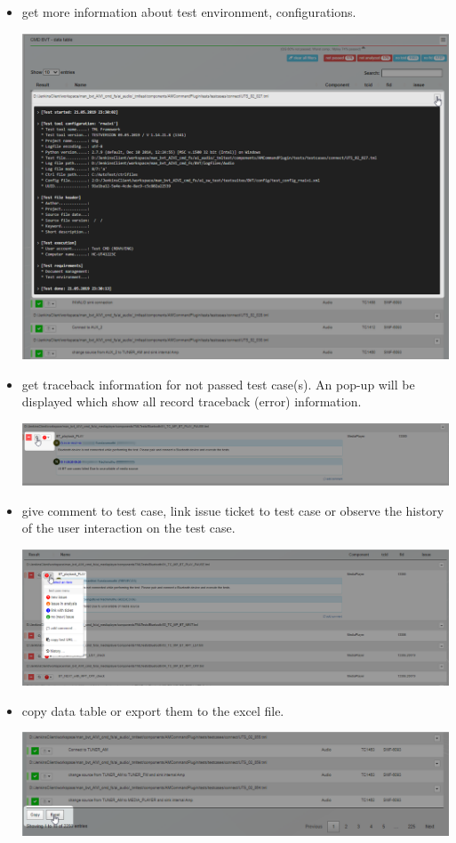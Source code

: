 \begin{itemize}
   \item get more information about test environment, configurations.
   
         \includegraphics[width=0.6\linewidth]{./pictures/datatable/testcase_detail.png}

   \item get traceback information for not passed test case(s). An pop-up will 
         be displayed which show all record traceback (error) information.

         \includegraphics[width=0.6\linewidth]{./pictures/datatable/testcase_traceback.png}

   \item give comment to test case, link issue ticket to test case or observe
         the history of the user interaction on the test case.

         \includegraphics[width=0.6\linewidth]{./pictures/datatable/testcase_menu.png}

   \item copy data table or export them to the excel file.

         \includegraphics[width=0.6\linewidth]{./pictures/datatable/copy_export.png}
\end{itemize}


